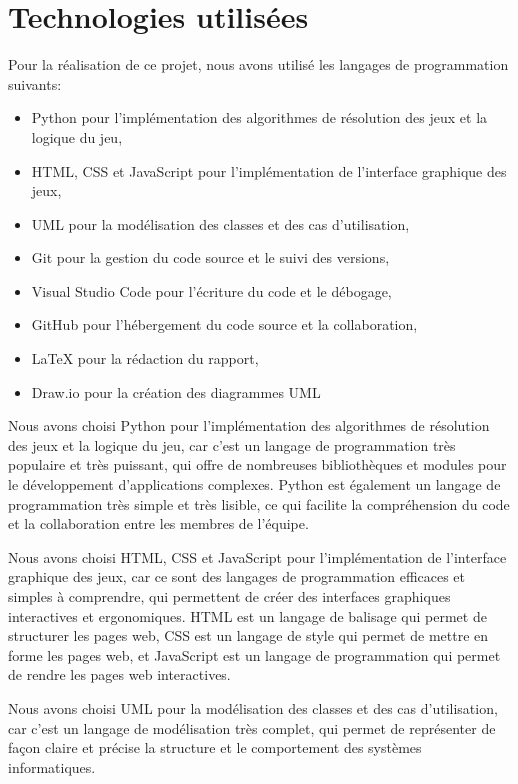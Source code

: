 \section{Technologies utilisées}

Pour la réalisation de ce projet, nous avons utilisé les langages de programmation suivants:
\begin{itemize}
	\item Python pour l'implémentation des algorithmes de résolution des jeux et la logique du jeu,
	\item HTML, CSS et JavaScript pour l'implémentation de l'interface graphique des jeux,
	\item UML pour la modélisation des classes et des cas d'utilisation,
	\item Git pour la gestion du code source et le suivi des versions,
	\item Visual Studio Code pour l'écriture du code et le débogage,
	\item GitHub pour l'hébergement du code source et la collaboration,
	\item LaTeX pour la rédaction du rapport,
	\item Draw.io pour la création des diagrammes UML
\end{itemize}

Nous avons choisi Python pour l'implémentation des algorithmes de résolution des 
jeux et la logique du jeu, car c'est un langage de programmation très populaire et 
très puissant, qui offre de nombreuses bibliothèques et modules pour le 
développement d'applications complexes. 
Python est également un langage de programmation très simple et très lisible, 
ce qui facilite la compréhension du code et la collaboration entre les membres de 
l'équipe.

Nous avons choisi HTML, CSS et JavaScript pour l'implémentation de l'interface
graphique des jeux, car ce sont des langages de programmation efficaces et 
simples à comprendre, qui permettent de créer des interfaces graphiques interactives 
et ergonomiques. HTML est un langage de balisage qui permet de structurer les pages
web, CSS est un langage de style qui permet de mettre en forme les pages web, et
JavaScript est un langage de programmation qui permet de rendre les pages web
interactives.

Nous avons choisi UML pour la modélisation des classes et des cas d'utilisation,
car c'est un langage de modélisation très complet, qui permet de représenter de
façon claire et précise la structure et le comportement des systèmes informatiques.

